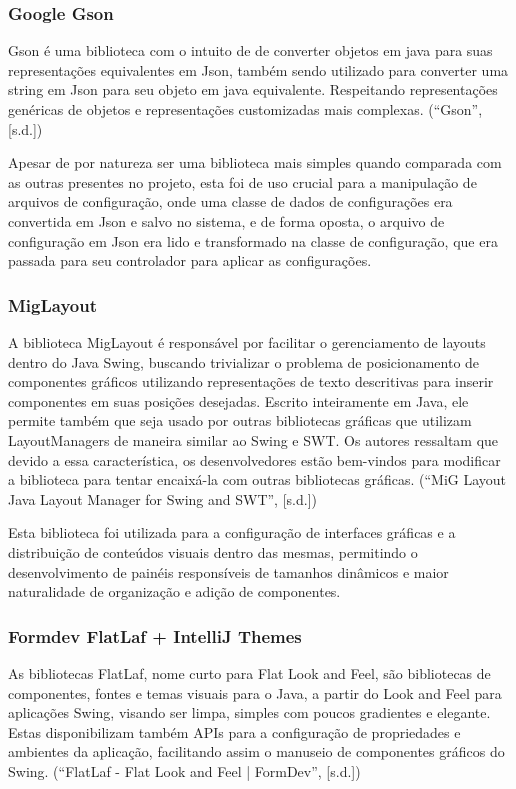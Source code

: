 \documentclass[a4paper,12pt]{article}
\begin{document}
\subsubsection{Google Gson}
Gson é uma biblioteca com o intuito de de converter objetos em java para suas representações equivalentes em Json, 
também sendo utilizado para converter uma string em Json para seu objeto em java equivalente. Respeitando representações 
genéricas de objetos e representações customizadas mais complexas. (“Gson”, [s.d.])

Apesar de por natureza ser uma biblioteca mais simples quando comparada com as outras presentes no projeto, esta 
foi de uso crucial para a manipulação de arquivos de configuração, onde uma classe de dados de configurações era 
convertida em Json e salvo no sistema, e de forma oposta, o arquivo de configuração em Json era lido e transformado 
na classe de configuração, que era passada para seu controlador para aplicar as configurações.

\subsubsection{MigLayout}
A biblioteca MigLayout é responsável por facilitar o gerenciamento de layouts dentro do Java Swing, buscando trivializar 
o problema de posicionamento de componentes gráficos utilizando representações de texto descritivas para inserir componentes 
em suas posições desejadas. Escrito inteiramente em Java, ele permite também que seja usado por outras bibliotecas gráficas 
que utilizam LayoutManagers de maneira similar ao Swing e SWT. Os autores ressaltam que devido a essa característica, os 
desenvolvedores estão bem-vindos para modificar a biblioteca para tentar encaixá-la com outras bibliotecas gráficas.
(“MiG Layout Java Layout Manager for Swing and SWT”, [s.d.])

Esta biblioteca foi utilizada para a configuração de interfaces gráficas e a distribuição de conteúdos visuais 
dentro das mesmas, permitindo o desenvolvimento de painéis responsíveis de tamanhos dinâmicos e maior naturalidade de organização e adição de componentes.

\subsubsection{Formdev FlatLaf + IntelliJ Themes}
As bibliotecas FlatLaf, nome curto para Flat Look and Feel, são bibliotecas de componentes, fontes e temas visuais para o Java, 
a partir do Look and Feel para aplicações Swing, visando ser limpa, simples com poucos gradientes e elegante. Estas disponibilizam 
também APIs para a configuração de propriedades e ambientes da aplicação, facilitando assim o manuseio de componentes gráficos do 
Swing. (“FlatLaf - Flat Look and Feel | FormDev”, [s.d.])
\end{document}
